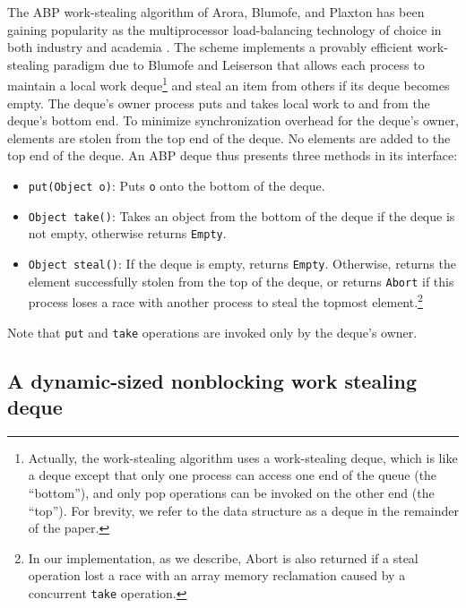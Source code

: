 The ABP work-stealing algorithm of Arora, Blumofe, and Plaxton
\cite{Arora2001} has been gaining popularity as the multiprocessor
load-balancing technology of choice in both industry and academia
\cite{Arora2001, Acar2002, Blumofe1995, Frigo1998, Danaher2005}. The
scheme implements a provably efficient work-stealing paradigm due to
Blumofe and Leiserson \cite{Blumofe1999} that allows each process to
maintain a local work deque\footnote{Actually, the work-stealing
  algorithm uses a work-stealing deque, which is like a deque
  \cite{Knuth1997} except that only one process can access one end of
  the queue (the ``bottom''), and only pop operations can be invoked
  on the other end (the ``top'').  For brevity, we refer to the data
  structure as a deque in the remainder of the paper.} and steal an
item from others if its deque becomes empty. The deque's owner process
puts and takes local work to and from the deque's bottom end. To
minimize synchronization overhead for the deque's owner, elements are
stolen from the top end of the deque. No elements are added to the top
end of the deque. An ABP deque thus presents three methods in its
interface:

\begin{itemize}
\item \lstinline!put(Object o)!: Puts \lstinline!o! onto the bottom
  of the deque.
\item \lstinline!Object take()!: Takes an object from the bottom of the
  deque if the deque is not empty, otherwise returns
  \lstinline!Empty!.
\item \lstinline!Object steal()!: If the deque is empty, returns
  \lstinline!Empty!. Otherwise, returns the element successfully
  stolen from the top of the deque, or returns \lstinline!Abort! if
  this process loses a race with another process to steal the topmost
  element.\footnote{In our implementation, as we describe, Abort is
    also returned if a steal operation lost a race with an array
    memory reclamation caused by a concurrent \lstinline!take!
    operation.}
\end{itemize}

Note that \lstinline!put! and \lstinline!take! operations
are invoked only by the deque's owner.

\subsection{A dynamic-sized nonblocking work stealing deque
  \cite{Hendler2006, Hendler2006a}}

